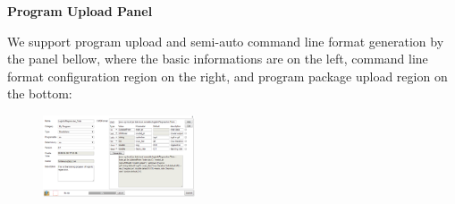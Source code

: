 \documentclass{sig-alternate-05-2015}
\begin{document}
\noindent\textbf{Program Upload Panel}

We support program upload and semi-auto command line format generation by the panel bellow, where the basic informations are on the left, command line format configuration region on the right, and program package upload region on the bottom:

\begin{figure}[!htb]
\centering
\includegraphics[width = 0.4\textwidth]{Upload_Program.eps}
\end{figure}
\end{document}
